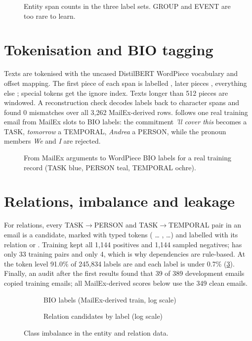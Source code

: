 \begin{figure}[htbp]
\centering
{}
\caption{Entity span counts in the three label sets. GROUP and EVENT are too rare to learn.}
\label{fig:entitydist}
\end{figure}
\section{Tokenisation and BIO tagging}
Texts are tokenised with the uncased DistilBERT WordPiece vocabulary and offset mapping. The first piece of each span is labelled , later pieces , everything else ; special tokens get the ignore index. Texts longer than 512 pieces are windowed. A reconstruction check decodes labels back to character spans and found 0 mismatches over all 3,262 MailEx-derived rows.  follows one real training email from MailEx slots to BIO labels: the commitment \emph{'ll cover this} becomes a TASK, \emph{tomorrow} a TEMPORAL, \emph{Andrea} a PERSON, while the pronoun members \emph{We} and \emph{I} are rejected.

\begin{figure}[htbp]
\centering
{}
\caption{From MailEx arguments to WordPiece BIO labels for a real training record (TASK blue, PERSON teal, TEMPORAL ochre).}
\label{fig:bio}
\end{figure}

\section{Relations, imbalance and leakage}
For relations, every TASK$\to$PERSON and TASK$\to$TEMPORAL pair in an email is a candidate, marked with typed tokens (\code{[E1\_TASK]} \ldots{} \code{[/E1\_TASK]}, \code{[E2\_TEMPORAL]} \ldots) and labelled with its relation or . Training kept all 1,144 positives and 1,144 sampled negatives;  has only 33 training pairs and  only 4, which is why dependencies are rule-based. At the token level 91.0\% of 245,834 labels are  and each  label is under 0.7\% (\cref{fig:imbalance}). Finally, an audit after the first results found that 39 of 389 development emails copied training emails; all MailEx-derived scores below use the 349 clean emails.

\begin{figure}[htbp]
\centering
\begin{subfigure}[b]{0.49\linewidth}\centering{}\caption{BIO labels (MailEx-derived train, log scale)}\end{subfigure}\hfill
\begin{subfigure}[b]{0.49\linewidth}\centering{}\caption{Relation candidates by label (log scale)}\end{subfigure}
\caption{Class imbalance in the entity and relation data.}
\label{fig:imbalance}
\end{figure}
